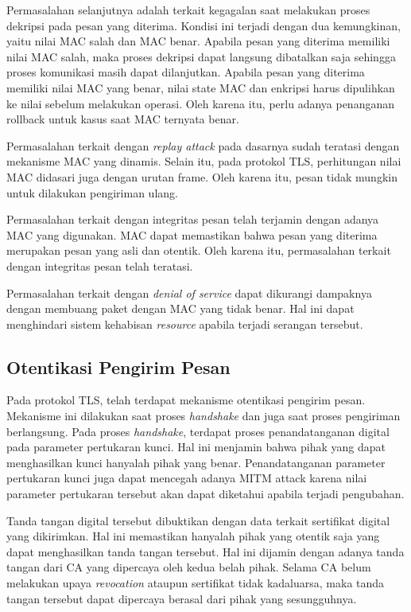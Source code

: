 Permasalahan selanjutnya adalah terkait kegagalan saat melakukan proses dekripsi pada pesan yang diterima. Kondisi ini terjadi dengan dua kemungkinan, yaitu nilai MAC salah dan MAC benar. Apabila pesan yang diterima memiliki nilai MAC salah, maka proses dekripsi dapat langsung dibatalkan saja sehingga proses komunikasi masih dapat dilanjutkan. Apabila pesan yang diterima memiliki nilai MAC yang benar, nilai state MAC dan enkripsi harus dipulihkan ke nilai sebelum melakukan operasi. Oleh karena itu, perlu adanya penanganan rollback untuk kasus saat MAC ternyata benar.

Permasalahan terkait dengan \emph{replay attack} pada dasarnya sudah teratasi dengan mekanisme MAC yang dinamis. Selain itu, pada protokol TLS, perhitungan nilai MAC didasari juga dengan urutan frame. Oleh karena itu, pesan tidak mungkin untuk dilakukan pengiriman ulang.

Permasalahan terkait dengan integritas pesan telah terjamin dengan adanya MAC yang digunakan. MAC dapat memastikan bahwa pesan yang diterima merupakan pesan yang asli dan otentik. Oleh karena itu, permasalahan terkait dengan integritas pesan telah teratasi.

Permasalahan terkait dengan \emph{denial of service} dapat dikurangi dampaknya dengan membuang paket dengan MAC yang tidak benar. Hal ini dapat menghindari sistem kehabisan \emph{resource} apabila terjadi serangan tersebut.

\subsection{Otentikasi Pengirim Pesan}

Pada protokol TLS, telah terdapat mekanisme otentikasi pengirim pesan. Mekanisme ini dilakukan saat proses \emph{handshake} dan juga saat proses pengiriman berlangsung. Pada proses \emph{handshake}, terdapat proses penandatanganan digital pada parameter pertukaran kunci. Hal ini menjamin bahwa pihak yang dapat menghasilkan kunci hanyalah pihak yang benar. Penandatanganan parameter pertukaran kunci juga dapat mencegah adanya MITM attack karena nilai parameter pertukaran tersebut akan dapat diketahui apabila terjadi pengubahan.

Tanda tangan digital tersebut dibuktikan dengan data terkait sertifikat digital yang dikirimkan. Hal ini memastikan hanyalah pihak yang otentik saja yang dapat menghasilkan tanda tangan tersebut. Hal ini dijamin dengan adanya tanda tangan dari CA yang dipercaya oleh kedua belah pihak. Selama CA belum melakukan upaya \emph{revocation} ataupun sertifikat tidak kadaluarsa, maka tanda tangan tersebut dapat dipercaya berasal dari pihak yang sesungguhnya.


